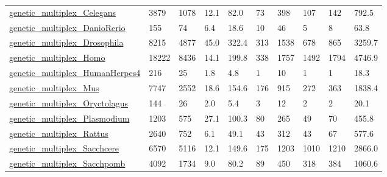 \begin{longtable}{llllllllll}
 \href{https://manliodedomenico.com/data.php}{genetic\_multiplex\_Celegans}                                                   & 3879       & 1078  & 12.1   & 82.0   & 73    & 398    & 107    & 142    & 792.5   \\
 \href{https://manliodedomenico.com/data.php}{genetic\_multiplex\_DanioRerio}                                                 & 155        & 74    & 6.4    & 18.6   & 10    & 46     & 5      & 8      & 63.8    \\
 \href{https://manliodedomenico.com/data.php}{genetic\_multiplex\_Drosophila}                                                 & 8215       & 4877  & 45.0   & 322.4  & 313   & 1538   & 678    & 865    & 3259.7  \\
 \href{https://manliodedomenico.com/data.php}{genetic\_multiplex\_Homo}                                                       & 18222      & 8436  & 14.1   & 199.8  & 338   & 1757   & 1492   & 1794   & 4746.9  \\
 \href{https://manliodedomenico.com/data.php}{genetic\_multiplex\_HumanHerpes4}                                               & 216        & 25    & 1.8    & 4.8    & 1     & 10     & 1      & 1      & 18.3    \\
 \href{https://manliodedomenico.com/data.php}{genetic\_multiplex\_Mus}                                                        & 7747       & 2552  & 18.6   & 154.6  & 176   & 915    & 272    & 363    & 1838.4  \\
 \href{https://manliodedomenico.com/data.php}{genetic\_multiplex\_Oryctolagus}                                                & 144        & 26    & 2.0    & 5.4    & 3     & 12     & 2      & 2      & 20.1    \\
 \href{https://manliodedomenico.com/data.php}{genetic\_multiplex\_Plasmodium}                                                 & 1203       & 575   & 27.1   & 100.3  & 80    & 265    & 49     & 70     & 455.8   \\
 \href{https://manliodedomenico.com/data.php}{genetic\_multiplex\_Rattus}                                                     & 2640       & 752   & 6.1    & 49.1   & 43    & 312    & 43     & 67     & 577.6   \\
 \href{https://manliodedomenico.com/data.php}{genetic\_multiplex\_Sacchcere}                                                  & 6570       & 5116  & 12.1   & 149.6  & 175   & 1203   & 1010   & 1210   & 2866.0  \\
 \href{https://manliodedomenico.com/data.php}{genetic\_multiplex\_Sacchpomb}                                                  & 4092       & 1734  & 9.0    & 80.2   & 89    & 450    & 318    & 384    & 1060.6  \\

\end{longtable}
